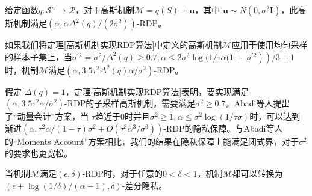 \begin{theorem}\label{高斯机制实现RDP算法}
给定函数$q: \mathcal{S}^{n} \rightarrow \mathcal{R}$，对于高斯机制$\mathcal{M}=q(S)+\mathbf{u}$，其中 $\mathbf{u} \sim N\left(0, \sigma^{2} \mathbf{I}\right)$，此高斯机制满足$\left(\alpha, \alpha \Delta^{2}(q) /\left(2 \sigma^{2}\right)\right)$-RDP。
\end{theorem}

如果我们将定理\ref{高斯机制实现RDP算法}中定义的高斯机制$\mathcal{M}$应用于使用均匀采样的样本子集上，当$\sigma^{\prime 2}=\sigma^{2} / \Delta^{2}(q) \geq 0.7, \alpha \leq 2 \sigma^{2} \log (1 / \tau \alpha(1+$ $\left.\left.\sigma^{\prime 2}\right)\right) / 3+1$时，机制$\mathcal{M}$满足$\left(\alpha, 3.5 \tau^{2} \Delta^{2}(q) \alpha / \sigma^{2}\right)$-RDP。

假定 $\Delta(q)=1$，定理\ref{高斯机制实现RDP算法}表明，要实现满足 $\left(\alpha, 3.5 \tau^{2} \alpha / \sigma^{2}\right)$-RDP的子采样高斯机制，需要满足$\sigma^{2} \geq 0.7$。Abadi等人提出了“动量会计”方案，当 $\tau$趋近于0时并且$\sigma^{2} \geq 1, \alpha \leq \sigma^{2} \log (1 / \tau \sigma)$时，可以达到渐进$\left(\alpha, \tau^{2} \alpha /(1-\tau) \sigma^{2}+O\left(\tau^{3} \alpha^{3} / \sigma^{3}\right)\right)$-RDP的隐私保障。与Abadi等人的“Moments Account”方案相比，我们的结果在隐私保障上能满足闭式界，对于$\sigma^{2}$的要求也更宽松。

\begin{theorem}\label{RDP向DP的转换}
当机制$\mathcal{M}$满足$(\epsilon, \delta)$-RDP时，对于任意的$0<\delta<1$，机制$\mathcal{M}$都可以转换为$(\epsilon+\log (1 / \delta) /(\alpha-1), \delta)$-差分隐私。
\end{theorem}

